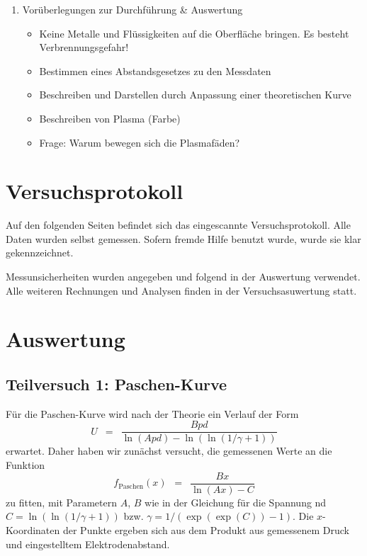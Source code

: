 \documentclass{article}
\newcommand{\widespace}{\enspace}
\newcommand{\wideeq}{\widespace = \widespace}
\begin{document}
\begin{enumerate}[label = (\Roman*)]
    \item Vorüberlegungen zur Durchführung \& Auswertung
        \begin{itemize}
            \item Keine Metalle und Flüssigkeiten auf die Oberfläche bringen. Es besteht Verbrennungsgefahr!
            \item Bestimmen eines Abstandsgesetzes zu den Messdaten
            \item Beschreiben und Darstellen durch Anpassung einer theoretischen Kurve
            \item Beschreiben von Plasma (Farbe)
            \item Frage: Warum bewegen sich die Plasmafäden?
        \end{itemize}
        
\end{enumerate}

\newpage


\section{Versuchsprotokoll}

Auf den folgenden Seiten befindet sich das eingescannte Versuchsprotokoll.
Alle Daten wurden selbst gemessen. Sofern fremde Hilfe benutzt wurde,
wurde sie klar gekennzeichnet.

Messunsicherheiten wurden angegeben und folgend in der Auswertung verwendet.
Alle weiteren Rechnungen und Analysen finden in der Versuchsasuwertung statt.



\newpage

\section{Auswertung}

\subsection{Teilversuch 1: Paschen-Kurve}

Für die Paschen-Kurve wird nach der Theorie ein Verlauf der Form
\[
    U \wideeq \frac{Bpd}{\ln(Apd) - \ln(\ln(1 / \gamma + 1))}
\]
erwartet. Daher haben wir zunächst versucht, die gemessenen Werte an die Funktion
\[
    f_\text{Paschen}(x) \wideeq \frac{B x}{\ln(A x) - C}
\]
zu fitten, mit Parametern $A$, $B$ wie in der Gleichung für die Spannung
nd $C = \ln(\ln(1 / \gamma + 1))$ bzw. $\gamma = 1 / (\exp(\exp(C)) - 1)$.
Die $x$-Koordinaten der Punkte ergeben sich aus dem Produkt aus
gemessenem Druck und eingestelltem Elektrodenabstand.
\end{document}
